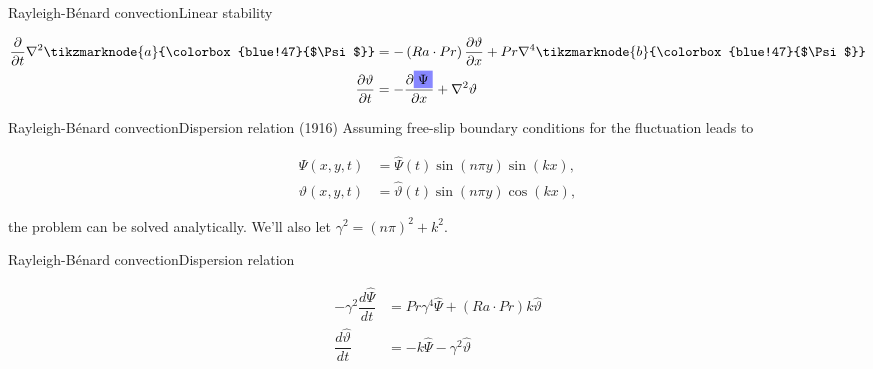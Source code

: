 \documentclass[usenames, dvipsnames, aspectratio=169]{beamer}
\newcommand{\highlightdark}[2]{\colorbox{#1!47}{$\displaystyle #2$}}
\renewcommand{\highlightdark}[2]{\colorbox{#1!47}{#2}}
\newcommand{\lap}{\nabla^2}
\begin{document}
\begin{frame}[t, c]{Rayleigh-Bénard convection}{Linear stability}
  \vfill
  \large

  \[
  \begin{aligned}
    \dfrac{\partial}{\partial t} \lap \tikzmarknode{a} {\highlightdark{blue}{$\Psi$}} & = - \left( Ra \cdot Pr \right) \dfrac{\partial \vartheta}{\partial x} + Pr \nabla^4 \tikzmarknode{b} {\highlightdark{blue}{$\Psi$}} \\
    \dfrac{\partial \vartheta}{\partial t} & = -\dfrac{\partial \highlightdark{blue}{$\Psi$}}{\partial x} + \lap \vartheta
  \end{aligned}
  \]

  \vfill
\end{frame}

\begin{frame}[t, c]{Rayleigh-Bénard convection}{Dispersion relation}
  (1916) Assuming free-slip boundary conditions for the fluctuation leads to

  \[
  \begin{aligned}
    \Psi(x, y, t) & =  \hat{\Psi}(t) \sin(n \pi y) \sin(kx), \\
    \vartheta(x, y, t) & = \hat{\vartheta}(t) \sin(n \pi y) \cos(kx),
  \end{aligned}
  \]

  \bigskip

  the problem can be solved analytically.
  We'll also let $\gamma^2 = \left(n \pi \right)^2 + k^2$.
\end{frame}

\begin{frame}[t, c]{Rayleigh-Bénard convection}{Dispersion relation}
  \vfill
  \large

  \[
  \begin{aligned}
    -\gamma^2 \dfrac{d\hat{\Psi}}{dt} & = Pr \gamma^4 \hat{\Psi} + \left( Ra \cdot Pr \right) k \hat{\vartheta} \\
    \dfrac{d\hat{\vartheta}}{dt} & = -k \hat{\Psi} - \gamma^2 \hat{\vartheta}
  \end{aligned}
  \]

  \vfill
\end{frame}
\end{document}
